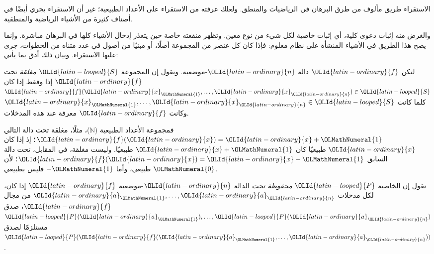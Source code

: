 \documentclass[../../../include/open-logic-section]{subfiles}
\begin{document}


\begin{explain}
الاستقراء طريق مألوف من طرق البرهان في الرياضيات والمنطق. ولعلك عرفته من
الاستقراء على الأعداد الطبيعية؛ غير أن الاستقراء يجري أيضًا في أصناف
كثيرة من الأشياء الرياضية والمنطقية.

والغرض منه إثبات دعوى كلية، أي إثبات خاصية لكل شيء من نوع معين. وتظهر
منفعته خاصة حين يتعذر إدخال الأشياء كلها في البرهان مباشرة. وإنما يصح
هذا الطريق في الأشياء المنشأة على نظام معلوم: فإذا كان كل عنصر من
المجموعة أصلًا، أو مبنيًا من أصول في عدد متناه من الخطوات، جرى عليها
الاستقراء. وبيان ذلك أدق بما يأتي:
\end{explain}

\begin{defn}
لتكن $\OLId{latin-ordinary}{f}$ دالة $\OLId{latin-ordinary}{n}$-موضعية. ونقول إن المجموعة $\OLId{latin-looped}{S}$ \emph{مغلقة} تحت $\OLId{latin-ordinary}{f}$
إذا وفقط إذا كان $\OLId{latin-ordinary}{f}(\OLId{latin-ordinary}{x}_\OLMathNumeral{1},\dots,\OLId{latin-ordinary}{x}_\OLId{latin-ordinary}{n}) \in \OLId{latin-looped}{S}$ كلما كانت
$\OLId{latin-ordinary}{x}_\OLMathNumeral{1},\dots,\OLId{latin-ordinary}{x}_\OLId{latin-ordinary}{n} \in \OLId{latin-looped}{S}$ وكانت $\OLId{latin-ordinary}{f}$ معرفة عند هذه المدخلات.
\end{defn}

\begin{explain}
فمجموعة الأعداد الطبيعية ($\mathbb{N}$)، مثلًا، مغلقة تحت دالة التالي
$\OLId{latin-ordinary}{f}(\OLId{latin-ordinary}{x}) = \OLId{latin-ordinary}{x}+\OLMathNumeral{1}$؛ إذ إذا كان $\OLId{latin-ordinary}{x}$ طبيعيًا كان $\OLId{latin-ordinary}{x}+\OLMathNumeral{1}$ طبيعيًا. وليست مغلقة،
في المقابل، تحت دالة السابق $\OLId{latin-ordinary}{f}(\OLId{latin-ordinary}{x}) = \OLId{latin-ordinary}{x}-\OLMathNumeral{1}$؛ لأن $\OLMathNumeral{0}$ طبيعي، وأما $-\OLMathNumeral{1}$
فليس بطبيعي.
\end{explain}

\begin{defn}
نقول إن الخاصية $\OLId{latin-looped}{P}$ \emph{محفوظة تحت} الدالة $\OLId{latin-ordinary}{n}$-موضعية $\OLId{latin-ordinary}{f}$ إذا كان،
لكل مدخلات $\OLId{latin-ordinary}{a}_\OLMathNumeral{1},\dots,\OLId{latin-ordinary}{a}_\OLId{latin-ordinary}{n}$ من مجال $\OLId{latin-ordinary}{f}$، صدق
$\OLId{latin-looped}{P}(\OLId{latin-ordinary}{a}_\OLMathNumeral{1}),\dots,\OLId{latin-looped}{P}(\OLId{latin-ordinary}{a}_\OLId{latin-ordinary}{n})$ مستلزمًا لصدق $\OLId{latin-looped}{P}(\OLId{latin-ordinary}{f}(\OLId{latin-ordinary}{a}_\OLMathNumeral{1},\dots,\OLId{latin-ordinary}{a}_\OLId{latin-ordinary}{n}))$.
\end{defn}
\end{document}
